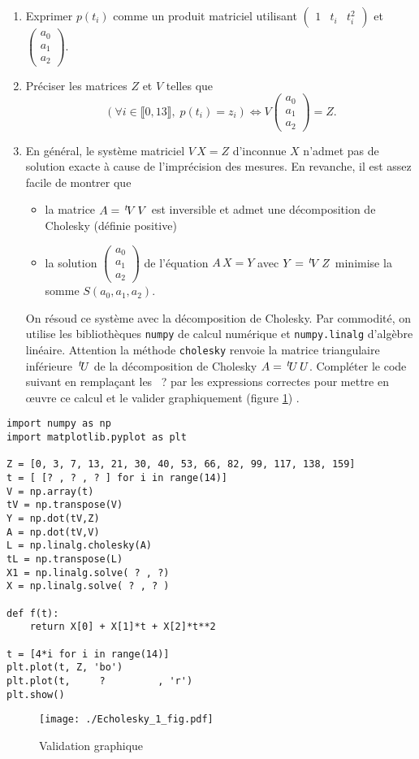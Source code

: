 \begin{enumerate}
 \item Exprimer $p(t_i)$ comme un produit matriciel utilisant $ \begin{pmatrix}
  1 & t_i & t_i^2
 \end{pmatrix}$
 et $ 
\begin{pmatrix}
 a_0 \\ a_1 \\ a_2
\end{pmatrix}
$.
\item Préciser les matrices $Z$ et $V$ telles que
\begin{displaymath}
 \left( \forall i \in\llbracket 0, 13\rrbracket, \; p(t_i) = z_i\right) \Leftrightarrow 
 V \begin{pmatrix}
 a_0 \\ a_1 \\ a_2
\end{pmatrix}
= Z.
\end{displaymath}
\item En général, le système matriciel $V\,X = Z$ d'inconnue $X$ n'admet pas de solution exacte à cause de l'imprécision des mesures. En revanche, il est assez facile de montrer que 
\begin{itemize}
 \item la matrice $A = \,\mathstrut^t\! V \, V$ est inversible et admet une décomposition de Cholesky (définie positive)
 \item la solution $ 
\begin{pmatrix}
 a_0 \\ a_1 \\ a_2
\end{pmatrix}
$ de l'équation $A\,X = Y$ avec $Y = \,\mathstrut^t\! V\,Z$ minimise la somme $S(a_0,a_1,a_2)$.
\end{itemize}
On résoud ce système avec la décomposition de Cholesky. Par commodité, on utilise les bibliothèques \texttt{numpy} de calcul numérique et \texttt{numpy.linalg} d'algèbre linéaire. Attention la méthode \texttt{cholesky} renvoie la matrice triangulaire inférieure $\,\mathstrut^t\! U$ de la décomposition de Cholesky $A = \,\mathstrut^t\! U\, U$.\newline
Compléter le code suivant en remplaçant les ~? par les expressions correctes pour mettre en \oe{}uvre ce calcul et le valider graphiquement (figure \ref{fig: Echolesky_2}) .
\end{enumerate}
\begin{verbatim}
import numpy as np
import matplotlib.pyplot as plt

Z = [0, 3, 7, 13, 21, 30, 40, 53, 66, 82, 99, 117, 138, 159]
t = [ [? , ? , ? ] for i in range(14)]
V = np.array(t)
tV = np.transpose(V)
Y = np.dot(tV,Z)
A = np.dot(tV,V)
L = np.linalg.cholesky(A) 
tL = np.transpose(L)
X1 = np.linalg.solve( ? , ?)
X = np.linalg.solve( ? , ? )

def f(t):
    return X[0] + X[1]*t + X[2]*t**2

t = [4*i for i in range(14)]
plt.plot(t, Z, 'bo')
plt.plot(t,     ?         , 'r')
plt.show()
\end{verbatim}
\begin{figure}
 \centering
 \texttt{[image: ./Echolesky\_1\_fig.pdf]}
 \caption{Validation graphique}
 \label{fig: Echolesky_2}
\end{figure}

